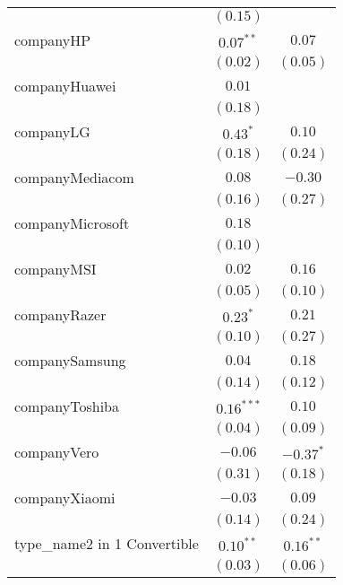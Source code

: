 \documentclass[
]{article}
\begin{document}
\begin{table}
\begin{center}
\begin{tabular}{l c c}
                              & $(0.15)$      &               \\
companyHP                     & $0.07^{**}$   & $0.07$        \\
                              & $(0.02)$      & $(0.05)$      \\
companyHuawei                 & $0.01$        &               \\
                              & $(0.18)$      &               \\
companyLG                     & $0.43^{*}$    & $0.10$        \\
                              & $(0.18)$      & $(0.24)$      \\
companyMediacom               & $0.08$        & $-0.30$       \\
                              & $(0.16)$      & $(0.27)$      \\
companyMicrosoft              & $0.18$        &               \\
                              & $(0.10)$      &               \\
companyMSI                    & $0.02$        & $0.16$        \\
                              & $(0.05)$      & $(0.10)$      \\
companyRazer                  & $0.23^{*}$    & $0.21$        \\
                              & $(0.10)$      & $(0.27)$      \\
companySamsung                & $0.04$        & $0.18$        \\
                              & $(0.14)$      & $(0.12)$      \\
companyToshiba                & $0.16^{***}$  & $0.10$        \\
                              & $(0.04)$      & $(0.09)$      \\
companyVero                   & $-0.06$       & $-0.37^{*}$   \\
                              & $(0.31)$      & $(0.18)$      \\
companyXiaomi                 & $-0.03$       & $0.09$        \\
                              & $(0.14)$      & $(0.24)$      \\
type\_name2 in 1 Convertible  & $0.10^{**}$   & $0.16^{**}$   \\
                              & $(0.03)$      & $(0.06)$      \\

\end{tabular}
\end{center}
\end{table}
\end{document}
